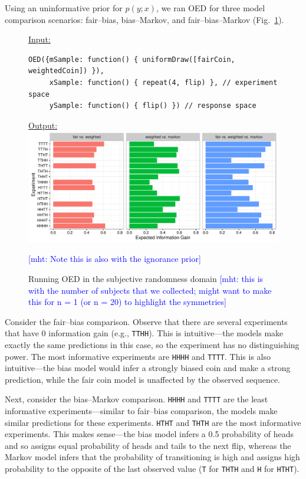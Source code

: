 \documentclass{article}
\newcommand{\mht}[1]{\textcolor{Blue}{[mht: #1]}}
\newcommand{\lou}[1]{\textcolor{orange}{[lou: #1]}}
\begin{document}
Using an uninformative prior for $p(y; x)$, we ran OED for three model comparison scenarios: fair--bias, bias--Markov, and fair--bias--Markov (Fig.~\ref{fig:run-coin}).

\begin{figure}[h]
\underline{\textsf{Input:}}
\begin{lstlisting}
OED({mSample: function() { uniformDraw([fairCoin, weightedCoin]) }),
     xSample: function() { repeat(4, flip) }, // experiment space
     ySample: function() { flip() }) // response space
\end{lstlisting}

\underline{\textsf{Output:}}\\
\includegraphics[width=\columnwidth]{img/coin_eig.pdf}
\caption{Running OED in the subjective randomness domain \mht{this is with the number of subjects that we collected; might want to make this for n = 1 (or n = 20) to highlight the symmetries}} \mht{Note this is also with the ignorance prior}
\label{fig:run-coin}
\end{figure}
Consider the fair--bias comparison.
Observe that there are several experiments that have 0 information gain (e.g., \lstinline{TTHH}).
This is intuitive---the models make exactly the same predictions in this case, so the experiment has no distinguishing power.
The most informative experiments are \lstinline{HHHH} and \lstinline{TTTT}.
This is also intuitive---the bias model would infer a strongly biased coin and make a strong prediction, while the fair coin model is unaffected by the observed sequence.

Next, consider the bias--Markov comparison.
\lstinline{HHHH} and \lstinline{TTTT} are the least informative experiments---similar to fair--bias comparison, the models make similar predictions for these experiments.
\lstinline{HTHT} and \lstinline{THTH} are the most informative experiments.
This makes sense---the bias model infers a 0.5 probability of heads and so assigns equal probability of heads and tails to the next flip, whereas the Markov model infers that the probability of transitioning is high and assigns high probability to the opposite of the last observed value (\lstinline{T} for \lstinline{THTH} and \lstinline{H} for \lstinline{HTHT}).
\end{document}

